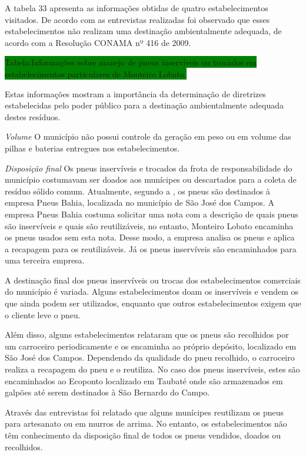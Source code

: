 \begin{description}
		A tabela 33 apresenta as informações obtidas de quatro estabelecimentos visitados. De acordo com as entrevistas realizadas foi observado que esses estabelecimentos não realizam uma destinação ambientalmente adequada, de acordo com a Resolução CONAMA nº 416 de 2009.
	
	\colorbox{green}{Tabela:Informações sobre manejo de pneus inservíveis ou trocados em estabelecimentos particulares de Monteiro Lobato.}
	
		Estas informações mostram a importância da determinação de diretrizes estabelecidas pelo poder público para a destinação ambientalmente adequada destes resíduos.
	
	\subitem \textit{Volume}
	O município não possui controle da geração em peso ou em volume das pilhas e baterias entregues nos estabelecimentos.
	
	\subitem \textit{Disposição final}
	Os pneus inservíveis e trocados da frota de responsabilidade do município costumavam ser doados aos munícipes ou descartados para a coleta de resíduo sólido comum. Atualmente, segundo a , os pneus são destinados à empresa Pneus Bahia, localizada no município de São José dos Campos. A empresa Pneus Bahia costuma solicitar uma nota com a descrição de quais pneus são inservíveis e quais são reutilizáveis, no entanto, Monteiro Lobato encaminha os pneus usados sem esta nota. Desse modo, a empresa analisa os pneus e aplica a recapagem para os reutilizáveis. Já os pneus inservíveis são encaminhados para uma terceira empresa.
	
	A destinação final dos pneus inservíveis ou trocas dos estabelecimentos comerciais do município é variada. Alguns estabelecimentos doam os inservíveis e vendem os que ainda podem ser utilizados, enquanto que outros estabelecimentos exigem que o cliente leve o pneu. 
	
	Além disso, alguns estabelecimentos relataram que os pneus são 
	recolhidos por um carroceiro periodicamente e os encaminha ao próprio depósito, localizado em São José dos Campos. Dependendo da qualidade do pneu recolhido, o carroceiro realiza a recapagem do pneu e o reutiliza. No caso dos pneus inservíveis, estes são encaminhados ao Ecoponto localizado em Taubaté onde são armazenados em galpões até serem destinados à São Bernardo do Campo.
	
	Através das entrevistas foi relatado que alguns munícipes reutilizam os pneus para artesanato ou em murros de arrima. No entanto, os estabelecimentos não têm conhecimento da disposição final de todos os pneus vendidos, doados ou recolhidos.
	

\end{description}
